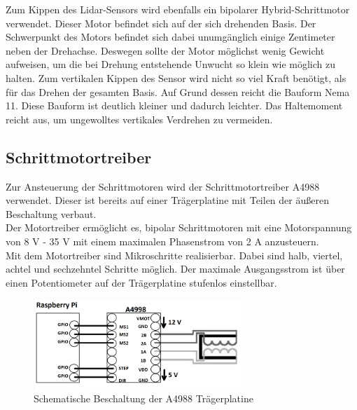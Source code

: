 Zum Kippen des Lidar-Sensors wird ebenfalls ein bipolarer Hybrid-Schrittmotor verwendet. Dieser Motor befindet sich auf der sich drehenden Basis. Der Schwerpunkt des Motors befindet sich dabei unumgänglich einige Zentimeter neben der Drehachse. Deswegen sollte der Motor möglichst wenig Gewicht aufweisen, um die bei Drehung entstehende Unwucht so klein wie möglich zu halten.
Zum vertikalen Kippen des Sensor wird nicht so viel Kraft benötigt, als für das Drehen der gesamten Basis. Auf Grund dessen reicht die Bauform Nema 11. Diese Bauform ist deutlich kleiner und dadurch leichter.
Das Haltemoment reicht aus, um ungewolltes vertikales Verdrehen zu vermeiden.


\subsection{Schrittmotortreiber} \label{sec:Schrittmotortreiber}
Zur Ansteuerung der Schrittmotoren wird der Schrittmotortreiber A4988 verwendet. Dieser ist bereits auf einer Trägerplatine mit Teilen der äußeren Beschaltung verbaut.\\
Der Motortreiber ermöglicht es, bipolar Schrittmotoren mit eine Motorspannung von 8 V - 35 V mit einem maximalen Phasenstrom von 2 A anzusteuern. \cite{A4988}\\ 
Mit dem Motortreiber sind Mikroschritte realisierbar. Dabei sind halb, viertel, achtel und sechzehntel Schritte möglich. Der maximale Ausgangsstrom ist über einen Potentiometer auf der Trägerplatine stufenlos einstellbar. 

\begin{figure}[H] 
	\centering 
	\includegraphics[width=0.7\textwidth]{images/Hardware/A4988} 
	\caption{Schematische Beschaltung der A4988 Trägerplatine} 
	\label{A4988} 
\end{figure} 



